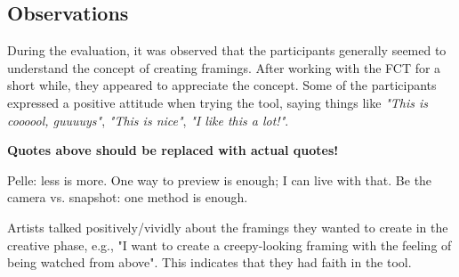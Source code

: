 \subsection{Observations}
During the evaluation, it was observed that the participants generally seemed to understand the concept of creating framings. After working with the FCT for a short while, they appeared to appreciate the concept. Some of the participants expressed a positive attitude when trying the tool, saying things like \textit{"This is coooool, guuuuys"}, \textit{"This is nice"}, \textit{"I like this a lot!"}.

\textbf{Quotes above should be replaced with actual quotes!}

Pelle: less is more. One way to preview is enough; I can live with that. Be the camera vs. snapshot: one method is enough.

Artists talked positively/vividly about the framings they wanted to create in the creative phase, e.g., "I want to create a creepy-looking framing with the feeling of being watched from above". This indicates that they had faith in the tool.